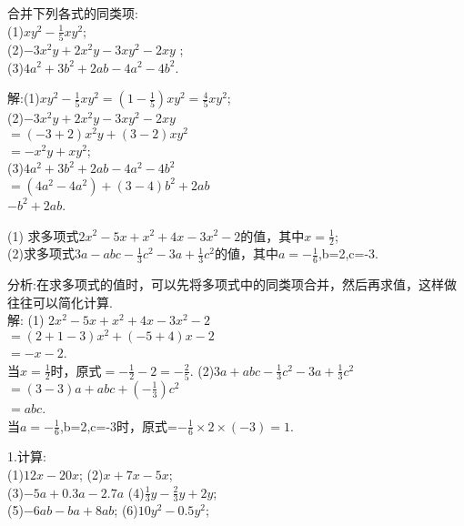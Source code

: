 \documentclass[UTF8]{report}
\theoremstyle{definition}
\theoremstyle{remark}
\begin{document}



\begin{exercise}合并下列各式的同类项:
 \\(1)$xy^{2}-\frac{1}{5}xy^{2}$;
 \\(2)$-3x^{2}y+2x^{2}y-3xy^{2}-2xy$ ;
 \\(3)$4a^{2}+3b^{2}+2ab-4a^{2}-4b^{2}$.
 \end{exercise}
 \begin{Answer}
 解:(1)$xy^{2}-\frac{1}{5}xy^{2}=(1-\frac{1}{5})xy^{2}=\frac{4}{5}xy^{2}$;
 \\(2)$-3x^{2}y+2x^{2}y-3xy^{2}-2xy$
 \\$=(-3+2)x^{2}y+(3-2)xy^{2}$
 \\$=-x^{2}y+xy^{2}$;
 \\(3)$4a^{2}+3b^{2}+2ab-4a^{2}-4b^{2}$
 \\$=(4a^{2}-4a^{2})+(3-4)b^{2}+2ab$
 \\$-b^{2}+2ab$.
 \end{Answer}

\begin{exercise}
(1) 求多项式$2x^{2}-5x+x^{2}+4x-3x^{2}-2$的值，其中$x=\frac{1}{2}$;
 \\(2)求多项式$3a-abc-\frac{1}{3}c^{2}-3a+\frac{1}{3}c^{2}$的値，其中$a=-\frac{1}{6}$,b=2,c=-3.
\end{exercise}
 \begin{Answer}
分析:在求多项式的值时，可以先将多项式中的同类项合并，然后再求值，这样做往往可以简化计算.
\\ 解: (1) $2x^{2}-5x+x^{2}+4x-3x^{2}-2$
      \\$=(2+1-3)x^{2}+(-5+4)x-2$
      \\$=-x-2$.
\\ 当$x=\frac{1}{2}$时，原式$=-\frac{1}{2}-2=-\frac{2}{5}$.
(2)$3a+abc-\frac{1}{3}c^{2}-3a+\frac{1}{3}c^{2}$
\\$=(3-3)a+abc+(-\frac{1}{3})c^{2}$
\\$=abc$.
\\ 当$a=-\frac{1}{6}$,b=2,c=-3时，原式=$-\frac{1}{6}\times2\times(-3)=1$.
\end{Answer}

\begin{exercise}
1.计算:
      \\(1)$12x-20x$;  (2)$x+7x-5x$;
      \\(3)$-5a+0.3a-2.7a$  (4)$\frac{1}{3}y-\frac{2}{3}y+2y$;
      \\(5)$-6ab-ba+8ab$;  (6)$10y^{2}-0.5y^{2}$;
\end{exercise}
\end{document}
